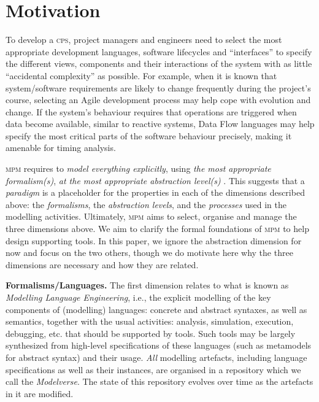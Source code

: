 \section{Motivation}
\label{sec:Motivation}

To develop a \textsc{cps}, project managers and engineers need to select the most 
appropriate development languages, software lifecycles and ``interfaces'' to 
specify the different views, components and their interactions of the system 
with as little ``accidental complexity''  \cite{BrooksSilverBullet} as possible. 
For example, when it is known that system/software 
requirements are likely to change frequently during the project's course, 
selecting an Agile development process may help cope with evolution and 
change. If the system's behaviour requires that operations are triggered when 
data become available, similar to reactive systems, Data Flow 
languages may help specify the most critical parts of the software behaviour precisely, 
making it amenable for timing analysis. 

\textsc{mpm} requires to \emph{model everything explicitly}, using \emph{the 
most appropriate formalism(s)}, \emph{at the most appropriate abstraction level(s)} 
\cite{PhD:VanTandeloo:2017}. This suggests that a \emph{paradigm} is a 
placeholder for the properties in each of the dimensions described 
above: the \emph{formalisms}, the \emph{abstraction levels}, and the 
\emph{processes} used in the modelling activities. 
Ultimately, \textsc{mpm} aims to select, organise and manage the 
three dimensions above. We aim to clarify the formal foundations of 
\textsc{mpm} to help design supporting tools. In this paper, we ignore the abstraction dimension 
for now and focus on the two others, though we do motivate here why the three dimensions are necessary and  how they are related.

\noindent
\textbf{Formalisms/Languages.} The first dimension relates to what is  
known as \emph{Modelling Language Engineering}, i.e., the explicit modelling of 
the key components of (modelling) languages: concrete and abstract syntaxes, 
as well as semantics, together with the usual activities: 
analysis, simulation, execution, debugging, etc. that should be 
supported by tools. Such tools may be largely synthesized from high-level 
specifications of these languages (such as metamodels for abstract syntax) and their usage. \emph{All} modelling artefacts, including 
language specifications as well as their instances, are 
organised in a repository which we call the \emph{Modelverse}.
The state of this repository evolves over time as the artefacts in it are modified.

